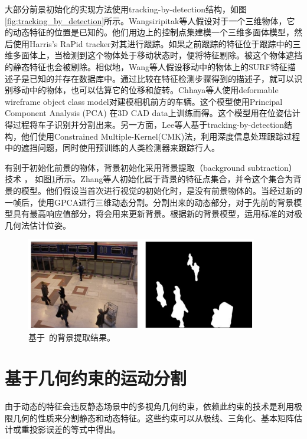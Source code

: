 大部分前景初始化的实现方法使用tracking-by-detection结构\cite{Breitenstein2010Online, Lee2014Driving}，如图\ref{fig:tracking_by_detection}所示。Wangsiripitak等人\cite{Wangsiripitak2009Avoiding}假设对于一个三维物体，它的动态特征的位置是已知的。他们用边上的控制点集建模一个三维多面体模型，然后使用Harris’s RaPid tracker\cite{Harris1990RAPID}对其进行跟踪。如果之前跟踪的特征位于跟踪中的三维多面体上，当检测到这个物体处于移动状态时，便将特征剔除。被这个物体遮挡的静态特征也会被剔除。相似地，Wang等人\cite{Wang2010Visual}假设移动中的物体上的SURF特征描述子\cite{Bay2008Speeded}是已知的并存在数据库中。通过比较在特征检测步骤得到的描述子，就可以识别移动中的物体，也可以估算它的位移和旋转。Chhaya等人\cite{Chhaya2016Monocular}使用deformable wireframe object class model对建模相机前方的车辆。这个模型使用Principal Component Analysis (PCA) 在3D CAD data上训练而得。这个模型用在位姿估计得过程将车子识别并分割出来。另一方面，Lee等人\cite{Lee2014Driving, Lee2016Ground}基于tracking-by-detection结构，他们使用Constrained Multiple-Kernel(CMK)法，利用深度信息处理跟踪过程中的遮挡问题，同时使用预训练的人类检测器来跟踪行人。

有别于初始化前景的物体，背景初始化采用背景提取（background subtraction）技术 \cite{Babaee2017A,Piccardi2005Background}， 如图\ref{fig:bgsub}所示。Zhang等人\cite{Zhang2012Visual}初始化属于背景的特征点集合，并令这个集合为背景的模型。他们假设当首次进行视觉的初始化时，是没有前景物体的。当经过新的一帧后，使用GPCA\cite{Ren2005Generalized}进行三维动态分割。分割出来的动态部分，对于先前的背景模型具有最高响应值部分，将会用来更新背景。根据新的背景模型，运用标准的对极几何法估计位姿。

\begin{figure}[thbp]
	\centering
	\includegraphics[width=0.9\textwidth]{figs/1-1/subback.png}
	\caption{基于~\cite{Babaee2017A}的背景提取结果。}
	\label{fig:bgsub}
\end{figure}

\section{基于几何约束的运动分割}
由于动态的特征会违反静态场景中的多视角几何约束，依赖此约束的技术是利用极限几何的性质\cite{Hartley2008Multiple}来分割静态和动态特征。这些约束可以从极线、三角化、基本矩阵估计或重投影误差的等式中得出。


